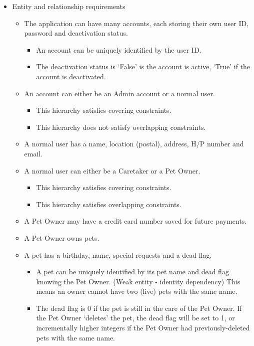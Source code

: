 \documentclass[10pt]{article}
\begin{document}
\begin{itemize}
    \item Entity and relationship requirements
    \begin{itemize}
        \item The application can have many accounts, each storing their own user ID, password and deactivation status.
	    \begin{itemize}
	        \item An account can be uniquely identified by the user ID.
	        \item The deactivation status is `False' is the account is active, `True' if the account is deactivated.
	    \end{itemize}
        \item An account can either be an Admin account or a normal user.
	    \begin{itemize}
	        \item This hierarchy satisfies covering constraints.
	        \item This hierarchy does not satisfy overlapping constraints.
	    \end{itemize}
		\item A normal user has a name, location (postal), address, H/P number and email.
        \item A normal user can either be a Caretaker or a Pet Owner.
        \begin{itemize}
	        \item This hierarchy satisfies covering constraints.
	        \item This hierarchy satisfies overlapping constraints.
	    \end{itemize}
        \item A Pet Owner may have a credit card number saved for future payments.
        \item A Pet Owner owns pets.
        \item A pet has a birthday, name, special requests and a dead flag.
        \begin{itemize}
            \item A pet can be uniquely identified by its pet name and dead flag knowing the Pet Owner. (Weak entity - identity dependency) This means an owner cannot have two (live) pets with the same name.
            \item The dead flag is 0 if the pet is still in the care of the Pet Owner. If the Pet Owner `deletes' the pet, the dead flag will be set to 1, or incrementally higher integers if the Pet Owner had previously-deleted pets with the same name.

\end{itemize}
\end{itemize}
\end{itemize}
\end{document}
